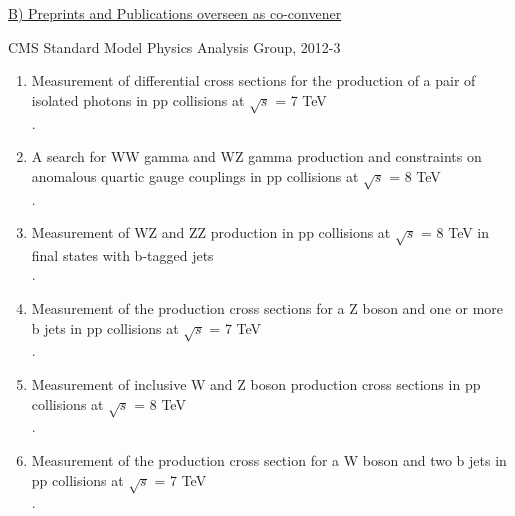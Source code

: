 \documentclass [12pt]{report}
\begin{document}
\noindent\underline{B) Preprints and Publications overseen as co-convener}

CMS Standard Model Physics Analysis Group, 2012-3

\begin{enumerate}

\item Measurement of differential cross sections for the production of a pair of isolated photons in pp collisions at $\sqrt{s}$ = 7 TeV \\
.

\item A search for WW gamma and WZ gamma production and constraints on anomalous quartic gauge couplings in pp collisions at $\sqrt{s}$ = 8 TeV \\
.

\item Measurement of WZ and ZZ production in pp collisions at $\sqrt{s}$ = 8 TeV in final states with b-tagged jets \\
.

\item Measurement of the production cross sections for a Z boson and one or more b jets in pp collisions at $\sqrt{s}$ = 7 TeV\\
.

\item Measurement of inclusive W and Z boson production cross sections in pp collisions at $\sqrt{s}$ = 8 TeV \\
.

\item Measurement of the production cross section for a W boson and two b jets in pp collisions at $\sqrt{s}$ = 7 TeV\\
.


\end{enumerate}
\end{document}
